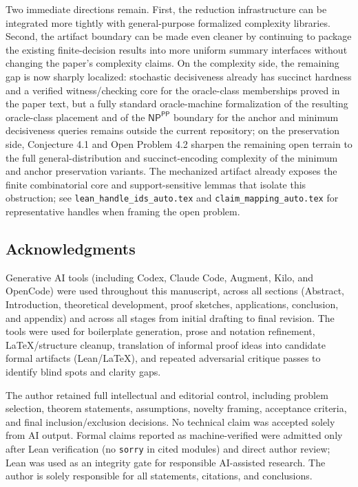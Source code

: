 Two immediate directions remain. First, the reduction infrastructure can be integrated more tightly with general-purpose formalized complexity libraries. Second, the artifact boundary can be made even cleaner by continuing to package the existing finite-decision results into more uniform summary interfaces without changing the paper's complexity claims. On the complexity side, the remaining gap is now sharply localized: stochastic decisiveness already has succinct hardness and a verified witness/checking core for the oracle-class memberships proved in the paper text, but a fully standard oracle-machine formalization of the resulting oracle-class placement and of the $\textsf{NP}^{\textsf{PP}}$ boundary for the anchor and minimum decisiveness queries remains outside the current repository; on the preservation side, Conjecture 4.1 and Open Problem 4.2 sharpen the remaining open terrain to the full general-distribution and succinct-encoding complexity of the minimum and anchor preservation variants. The mechanized artifact already exposes the finite combinatorial core and support-sensitive lemmas that isolate this obstruction; see \texttt{lean\_handle\_ids\_auto.tex} and \texttt{claim\_mapping\_auto.tex} for representative handles when framing the open problem. 

\subsection*{Acknowledgments}

Generative AI tools (including Codex, Claude Code, Augment, Kilo, and OpenCode) were used throughout this manuscript, across all sections (Abstract, Introduction, theoretical development, proof sketches, applications, conclusion, and appendix) and across all stages from initial drafting to final revision. The tools were used for boilerplate generation, prose and notation refinement, \LaTeX{}/structure cleanup, translation of informal proof ideas into candidate formal artifacts (Lean/\LaTeX{}), and repeated adversarial critique passes to identify blind spots and clarity gaps.

The author retained full intellectual and editorial control, including problem selection, theorem statements, assumptions, novelty framing, acceptance criteria, and final inclusion/exclusion decisions. No technical claim was accepted solely from AI output. Formal claims reported as machine-verified were admitted only after Lean verification (no \texttt{sorry} in cited modules) and direct author review; Lean was used as an integrity gate for responsible AI-assisted research. The author is solely responsible for all statements, citations, and conclusions.

\appendix
